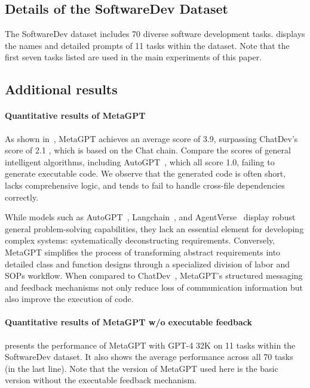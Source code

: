 \subsection{Details of the SoftwareDev Dataset}
The SoftwareDev dataset includes 70 diverse software development tasks.  displays the names and detailed prompts of 11 tasks within the dataset. Note that the first seven tasks listed are used in the main experiments of this paper. 

\subsection{Additional results}
\paragraph{Quantitative results of MetaGPT}
% 
As shown in~, MetaGPT achieves an average score of 3.9, surpassing ChatDev's score of 2.1 \cite{zhao2023chat}, which is based on the Chat chain. Compare the scores of general intelligent algorithms, including AutoGPT~\cite{autogpt_github}, which all score 1.0, failing to generate executable code. 
We observe that the generated code is often short, lacks comprehensive logic, and tends to fail to handle cross-file dependencies correctly.

While models such as AutoGPT~\citep{autogpt_github}, Langchain~\citep{Chase_LangChain_2022}, and AgentVerse~\citep{agentverse_github} display robust general problem-solving capabilities, they lack an essential element for developing complex systems: systematically deconstructing requirements.
% 
Conversely, MetaGPT simplifies the process of transforming abstract requirements into detailed class and function designs through a specialized division of labor and SOPs workflow.
%
When compared to ChatDev~\citep{zhao2023chat}, MetaGPT's structured messaging and feedback mechanisms not only reduce loss of communication information but also improve the execution of code.
% 

\paragraph{Quantitative results of MetaGPT w/o executable feedback}
 presents the performance of MetaGPT with GPT-4 32K on 11 tasks within the SoftwareDev dataset. It also shows the average performance across all 70 tasks (in the last line). Note that the version of MetaGPT used here is the basic version without the executable feedback mechanism.

